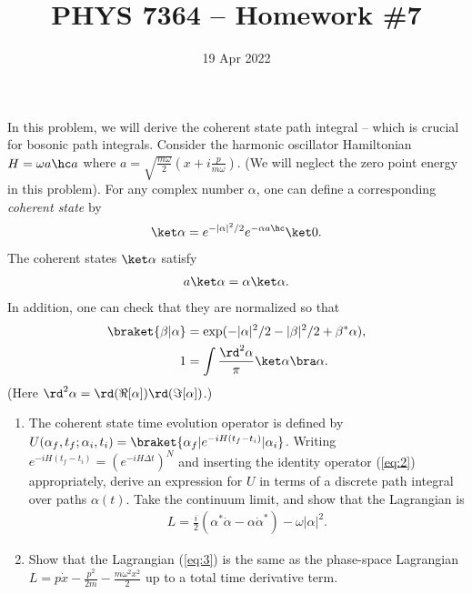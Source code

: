 \documentclass{jhwhw}
\author{}
\title{PHYS 7364 -- Homework \#7}
\date{19 Apr 2022}
\begin{document}

In this problem, we will derive the coherent state path integral -- which is crucial for bosonic path integrals. Consider the harmonic oscillator Hamiltonian $H=\omega a\hc a$ where $a = \sqrt{\frac{m\omega}2}(x + i \frac p {m\omega})$. (We will neglect the zero point energy in this problem). For any complex number $\alpha$, one can define a corresponding \emph{coherent state} by
\begin{align*}
   \ket\alpha = e^{-|\alpha|^2/2} e^{-\alpha a\hc} \ket 0.
\end{align*}
The coherent states $\ket \alpha$ satisfy
\begin{align*}
  a\ket\alpha = \alpha \ket \alpha.
\end{align*}
In addition, one can check that they are normalized so that
\begin{align}
  \braket{\beta | \alpha} &= \exp(-|\alpha|^2/2 - |\beta|^2/2 + \beta^*\alpha), \label{eq:1} \\
 1 & = \int \frac{\rd^2 \alpha}\pi \ket\alpha \bra \alpha \label{eq:2}.
\end{align}
(Here $\rd^2\alpha = \rd(\Re[\alpha]) \rd(\Im [\alpha])$.)
\begin{enumerate}
\item The coherent state time evolution operator is defined by $U(\alpha_f,t_f;\alpha_i,t_i) = \braket{\alpha_f|e^{-iH(t_f-t_i)}|\alpha_i}$. Writing $e^{-i H(t_f - t_i)} = (e^{-i H \Delta t})^N$ and inserting the identity operator (\ref{eq:2}) appropriately, derive an expression for $U$ in terms of a discrete path integral over paths $\alpha(t)$. Take the continuum limit, and show that the Lagrangian is
  \begin{align}
    L = \frac i 2 (\alpha^* \dot \alpha - \alpha \dot \alpha^*) - \omega |\alpha|^2.\label{eq:3}
  \end{align}
\item Show that the Lagrangian (\ref{eq:3}) is the same as the phase-space Lagrangian $L= p \dot x - \frac {p^2}{2m} - \frac{m\omega^2 x^2}2$ up to a total time derivative term.
\end{enumerate}


\end{document}
